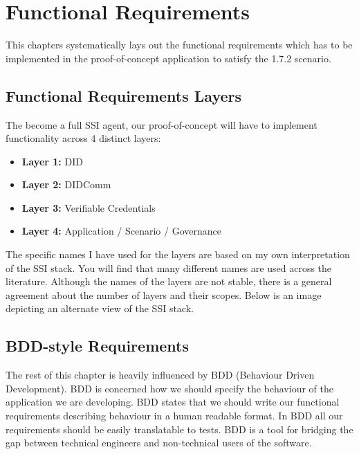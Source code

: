 \hypertarget{functional-requirements}{%
\chapter{Functional Requirements}\label{functional-requirements}}

This chapters systematically lays out the functional requirements which
has to be implemented in the proof-of-concept application to satisfy the
1.7.2 scenario.

\hypertarget{functional-requirements-layers}{%
\section{Functional Requirements
Layers}\label{functional-requirements-layers}}

The become a full SSI agent, our proof-of-concept will have to implement
functionality across 4 distinct layers:

\begin{itemize}
\tightlist
\item
  \textbf{Layer 1:} DID
\item
  \textbf{Layer 2:} DIDComm
\item
  \textbf{Layer 3:} Verifiable Credentials
\item
  \textbf{Layer 4:} Application / Scenario / Governance
\end{itemize}

The specific names I have used for the layers are based on my own
interpretation of the SSI stack. You will find that many different names
are used across the literature. Although the names of the layers are not
stable, there is a general agreement about the number of layers and
their scopes. Below is an image depicting an alternate view of the SSI
stack.



\hypertarget{bdd-style-requirements}{%
\section{BDD-style Requirements}\label{bdd-style-requirements}}

The rest of this chapter is heavily influenced by BDD (Behaviour Driven
Development). BDD is concerned how we should specify the behaviour of
the application we are developing. BDD states that we should write our
functional requirements describing behaviour in a human readable format.
In BDD all our requirements should be easily translatable to tests. BDD
is a tool for bridging the gap between technical engineers and
non-technical users of the software.


